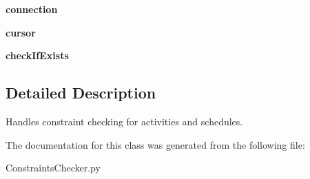 \begin{DoxyCompactItemize}
\item 
\hypertarget{classConstraintsChecker_1_1ConstraintsChecker_a30ca8cb6ae6f70e72c95f2c95c28994f}{{\bfseries connection}}\label{classConstraintsChecker_1_1ConstraintsChecker_a30ca8cb6ae6f70e72c95f2c95c28994f}

\item 
\hypertarget{classConstraintsChecker_1_1ConstraintsChecker_aec5ffe9f3153682500910f53e965804b}{{\bfseries cursor}}\label{classConstraintsChecker_1_1ConstraintsChecker_aec5ffe9f3153682500910f53e965804b}

\item 
\hypertarget{classConstraintsChecker_1_1ConstraintsChecker_af4064612fbb609651b02208077be8801}{{\bfseries check\-If\-Exists}}\label{classConstraintsChecker_1_1ConstraintsChecker_af4064612fbb609651b02208077be8801}

\end{DoxyCompactItemize}


\subsection{Detailed Description}
Handles constraint checking for activities and schedules. 

The documentation for this class was generated from the following file\-:\begin{DoxyCompactItemize}
\item 
Constraints\-Checker.\-py\end{DoxyCompactItemize}
